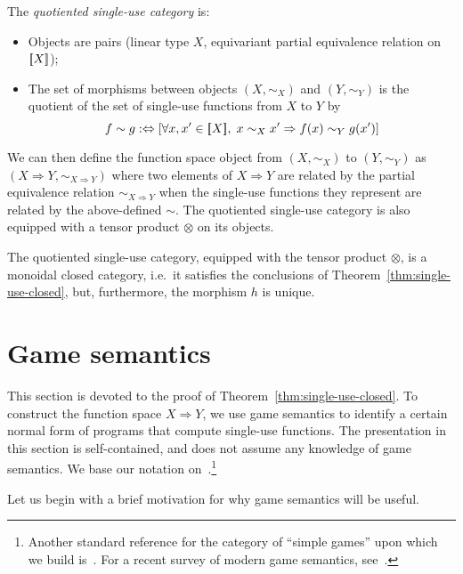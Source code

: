 \documentclass[a4paper,UKenglish,cleveref, autoref, numberwithinsect, thm-restate]{lipics-v2021}
\begin{document}
\begin{definition}
    The \emph{quotiented single-use category} is: 
    \begin{itemize}
    \item Objects are pairs (linear type $X$, equivariant partial equivalence relation on $[{\kern-0.45ex}[X]{\kern-0.45ex}]$);
    \item The set of morphisms between objects $(X,\sim_X)$ and $(Y,\sim_Y)$ is the quotient of the set of single-use functions from $X$ to $Y$ by
    \[ f \sim g :\Leftrightarrow \left[ \forall x,x' \in [{\kern-0.45ex}[X]{\kern-0.45ex}], \; x \sim_X x' \Rightarrow f(x) \sim_Y g(x') \right] \]
    \end{itemize}
\end{definition}
We can then define the function space object from $(X,\sim_X)$ to $(Y,\sim_Y)$ as $(X\Rightarrow Y, \sim_{X\Rightarrow Y})$ where two elements of $X\Rightarrow Y$ are related by the partial equivalence relation $\sim_{X\Rightarrow Y}$ when the single-use functions they represent are related by the above-defined $\sim$. The quotiented single-use category is also equipped with a tensor product $\otimes$ on its objects.
\begin{theorem}\label{thm:quotient-closed}
    The quotiented single-use category, equipped with the tensor product $\otimes$, is a monoidal closed category, i.e.~it satisfies the conclusions of Theorem~\ref{thm:single-use-closed}, but, furthermore, the morphism $h$ is unique.
\end{theorem}

\newcommand{\invar}[1]{#1_{\mathrm{in}}}
\newcommand{\outvar}[1]{#1_{\mathrm{out}}}

\section{Game semantics}
\label{sec:game-semantics}

This section is devoted to the proof of Theorem~\ref{thm:single-use-closed}. To construct the function space $X \Rightarrow Y$, we use game semantics to identify a certain normal form of programs that compute single-use functions. The presentation in this section is self-contained, and does not assume any knowledge of game semantics. We base our notation on~\cite{abramsky2013semantics}.\footnote{Another standard reference for the category of ``simple games'' upon which we build is~\cite{Hyland1997}. For a recent survey of modern game semantics, see~\cite{ClairambaultHDR}.}

Let us begin with a brief motivation for why game semantics will be useful.
\end{document}
